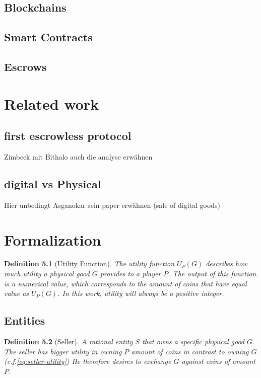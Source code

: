 \documentclass{cacthesis}
\newtheorem{definition}{Definition}
\begin{document}
\section{Blockchains}
\section{Smart Contracts}
\section{Escrows}

\chapter{Related work}
\section{first escrowless protocol}
Zimbeck mit Bithalo
auch die analyse erwähnen
\section{digital vs Physical}
Hier unbedingt Asganokar sein paper erwähnen (sale of digital goods)

\chapter{Formalization}

\begin{definition}[Utility Function]
\label{def:utility-function}
The utility function $U_P(G)$ describes how much utility a physical good $G$ provides to a player $P$. The output of this function is a numerical value, which corresponds to the amount of coins that have equal value as $U_P(G)$. In this work, utility will always be a positive integer.
\end{definition}

\section{Entities}

\begin{definition}[Seller]
\label{def:seller}
A rational entity $S$ that owns a specific physical good $G$. The seller
has bigger utility in owning $P$ amount of coins in contrast to owning $G$ (c.f.\ref{eq:seller-utility}) He therefore desires to exchange $G$ against coins of amount $P$.
\end{definition}
\end{document}
